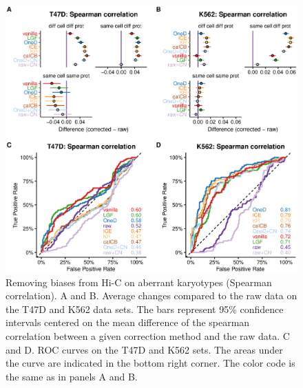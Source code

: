 \documentclass[12pt]{report}
\begin{document}
\begin{figure}
	\centerline{\includegraphics[width=\textwidth]{nar_figures/supp_figure_4.eps}}
    \caption{
    Removing biases from Hi-C on aberrant karyotypes (Spearman correlation). A and B. Average changes
    compared to the raw data on the T47D and K562 data sets. The bars represent
    95\% confidence intervals centered on the mean difference of the
    spearman correlation between a given correction method and the raw data. C
    and D. ROC curves on the T47D and K562 sets. The areas under the curve are
    indicated in the bottom right corner. The color code is the same as in panels A and B.}
\end{figure}
\end{document}
